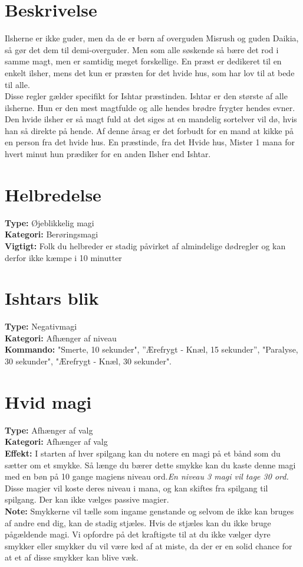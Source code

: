 \section{Beskrivelse}
Ilsherne er ikke guder, men da de er børn af overguden Misrush og guden Daikia, så gør det dem til demi-overguder. Men som alle søskende så bære det rod i samme magt, men er samtidig meget forskellige. En præst er dedikeret til en enkelt ilsher, mens det kun er præsten for det hvide hus, som har lov til at bede til alle.\\ 
Disse regler gælder specifikt for Ishtar præstinden. Ishtar er den største af alle ilsherne. Hun er den mest magtfulde og alle hendes brødre frygter hendes evner. Den hvide ilsher er så magt fuld at det siges at en mandelig sortelver vil dø, hvis han så direkte på hende. Af denne årsag er det forbudt for en mand at kikke på en person fra det hvide hus. En præstinde, fra det Hvide hus, Mister 1 mana for hvert minut hun prædiker for en anden Ilsher end Ishtar.

\section{Helbredelse}
\textbf{Type:} Øjeblikkelig magi \\
\textbf{Kategori:} Berøringsmagi\\
\textbf{Vigtigt:} Folk du helbreder er stadig påvirket af almindelige dødregler og kan derfor ikke kæmpe i 10 minutter


\section{Ishtars blik}
\textbf{Type:} Negativmagi\\
\textbf{Kategori:} Afhænger af niveau\\
\textbf{Kommando:} "Smerte, 10 sekunder", ”Ærefrygt - Knæl, 15 sekunder”, "Paralyse, 30 sekunder", "Ærefrygt - Knæl, 30 sekunder".


\section{Hvid magi}
\textbf{Type:} Afhænger af valg\\
\textbf{Kategori:} Afhænger af valg \\
\textbf{Effekt:} I starten af hver spilgang kan du notere en magi på et bånd som du sætter om et smykke. Så længe du bærer dette smykke kan du kaste denne magi med en bøn på 10 gange magiens niveau ord.\textit{En niveau 3 magi vil tage 30 ord.} Disse magier vil koste deres niveau i mana, og kan skiftes fra spilgang til spilgang. Der kan ikke vælges passive magier.\\
\textbf{Note:} Smykkerne vil tælle som ingame genstande og selvom de ikke kan bruges af andre end dig, kan de stadig stjæles. Hvis de stjæles kan du ikke bruge pågældende magi. Vi opfordre på det kraftigste til at du ikke vælger dyre smykker eller smykker du vil være ked af at miste, da der er en solid chance for at et af disse smykker kan blive væk.

